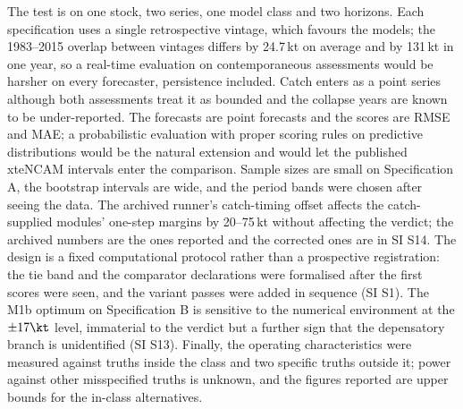The test is on one stock, two series, one model class and two horizons. Each specification uses a single retrospective vintage, which favours the models; the 1983--2015 overlap between vintages differs by 24.7\,kt on average and by 131\,kt in one year, so a real-time evaluation on contemporaneous assessments would be harsher on every forecaster, persistence included. Catch enters as a point series although both assessments treat it as bounded and the collapse years are known to be under-reported. The forecasts are point forecasts and the scores are RMSE and MAE; a probabilistic evaluation with proper scoring rules on predictive distributions \citep{HyndmanAthanasopoulos2021} would be the natural extension and would let the published xteNCAM intervals enter the comparison. Sample sizes are small on Specification A, the bootstrap intervals are wide, and the period bands were chosen after seeing the data. The archived runner's catch-timing offset affects the catch-supplied modules' one-step margins by 20--75\,kt without affecting the verdict; the archived numbers are the ones reported and the corrected ones are in SI S14. The design is a fixed computational protocol rather than a prospective registration: the tie band and the comparator declarations were formalised after the first scores were seen, and the variant passes were added in sequence (SI S1). The M1b optimum on Specification B is sensitive to the numerical environment at the $\pm17\kt$ level, immaterial to the verdict but a further sign that the depensatory branch is unidentified (SI S13). Finally, the operating characteristics were measured against truths inside the class and two specific truths outside it; power against other misspecified truths is unknown, and the figures reported are upper bounds for the in-class alternatives.
